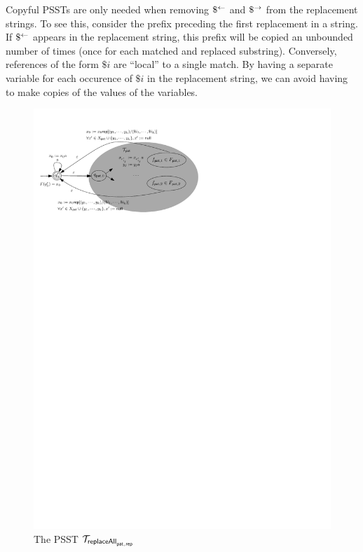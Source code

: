 Copyful PSSTs are only needed when removing $\$^{\leftarrow}$ and $\$^{\rightarrow}$ from the replacement strings.
To see this, consider the prefix preceding the first replacement in a string.
If $\$^{\leftarrow}$ appears in the replacement string, this prefix will be copied an unbounded number of times (once for each matched and replaced substring).
Conversely, references of the form $\$i$ are ``local'' to a single match.
By having a separate variable for each occurence of $\$i$ in the replacement string, we can avoid having to make copies of the values of the variables.

\begin{figure}[ht]
    \centering
    \includegraphics[scale=0.7]{psst-replaceall.pdf}
    \caption{The PSST $\mathcal{T}_{\mathsf{replaceAll}_{\mathsf{pat},\mathsf{rep}}}$}
    \label{fig-psst-replaceall}
\end{figure}


